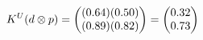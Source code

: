 \documentclass[preview]{standalone}
\begin{document}
\begin{align*}
\special{dvisvgm:raw <g id='unique000'>}K^U(d \otimes p) = \begin{pmatrix} (0.64)(0.50) \\ (0.89)(0.82) \end{pmatrix} = \begin{pmatrix} 0.32 \\ 0.73 \end{pmatrix}\special{dvisvgm:raw </g>}
\end{align*}
\end{document}

